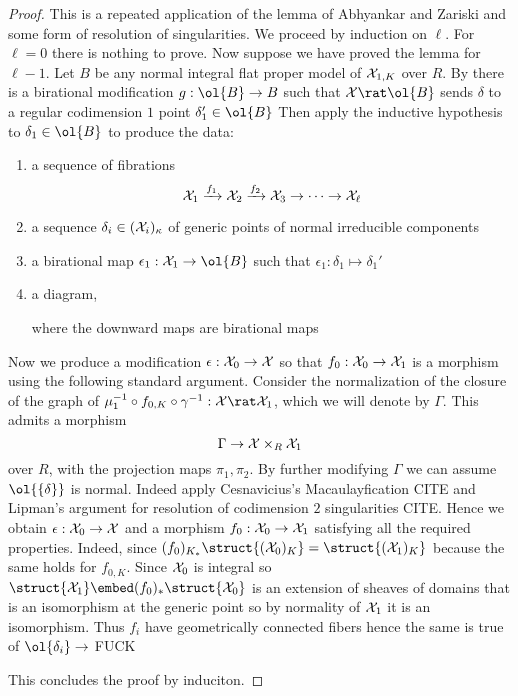 \documentclass[12pt]{article}
\theoremstyle{plain}
\begin{document}
\begin{proof}
This is a repeated application of the lemma of Abhyankar and Zariski \cite[Lemma 2.22]{KollarSingsMMP} and some form of resolution of singularities. We proceed by induction on $\ell$. For $\ell = 0$ there is nothing to prove. Now suppose we have proved the lemma for $\ell - 1$. Let $B$ be any normal integral flat proper model of $\mathcal{X}_{1,K}$ over $R$. By \cite[Lemma 2.22]{KollarSingsMMP} there is a birational modification $g : \ol{B} \to B$ such that $\X \rat \ol{B}$ sends $\delta$ to a regular codimension $1$ point $\delta_1' \in \ol{B}$  Then apply the inductive hypothesis to $\delta_1 \in \ol{B}$ to produce the data:
\begin{enumerate}
\item a sequence of fibrations
\[ \mathcal{X}_1 \xrightarrow{f_1} \mathcal{X}_2 \xrightarrow{f_2} \mathcal{X}_3 \to \cdots \to \mathcal{X}_{\ell} \]
\item a sequence $\delta_i \in (\mathcal{X}_i)_{\kappa}$ of generic points of normal irreducible components 
\item a birational map $\epsilon_1 : \X_1 \to \ol{B}$ such that $\epsilon_1 : \delta_1 \mapsto \delta_1'$
\item a diagram,
\begin{center}
\end{center}  
where the downward maps are birational maps 
\end{enumerate}
Now we produce a modification $\epsilon : \mathcal{X}_0 \to \mathcal{X}$ so that $f_0 : \mathcal{X}_0 \to \mathcal{X}_1$ is a morphism using the following standard argument. Consider the normalization of the closure of the graph of $\mu_1^{-1} \circ f_{0,K} \circ \gamma^{-1} : \X \rat \X_1$, which we will denote by $\Gamma$. This admits a morphism
\[ \Gamma \rightarrow \mathcal{X} \times_{R} \mathcal{X}_1 \]
over $R$, with the projection maps $\pi_{1}, \pi_{2}$. By further modifying $\Gamma$ we can assume $\ol{\{ \delta \}}$ is normal. Indeed apply Cesnavicius's Macaulayfication {\color{red} CITE} and Lipman's argument for resolution of codimension $2$ singularities {\color{red} CITE}. Hence we obtain $\epsilon : \mathcal{X}_0 \to \mathcal{X}$ and a morphism $f_0 : \mathcal{X}_0 \to \mathcal{X}_1$ satisfying all the required properties. Indeed, since $(f_0)_{K_*} \struct{(\X_0)_K} = \struct{(\X_1)_K}$ because the same holds for $f_{0,K}$. Since $\mathcal{X}_0$ is integral so $\struct{\X_1} \embed (f_0)_* \struct{\X_0}$ is an extension of sheaves of domains that is an isomorphism at the generic point so by normality of $\mathcal{X}_1$ it is an isomorphism. Thus $f_i$ have geometrically connected fibers hence the same is true of $\ol \{ \delta_i \} \to$ {\color{red} FUCK}


 This concludes the proof by induciton.
\end{proof}
\end{document}
